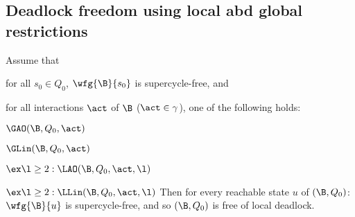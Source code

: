 







\subsection{Deadlock freedom using local abd global restrictions}


\label{theorem:local.deadlock-free}
Assume that
\bn
\item \label{theorem:local.deadlock-free.initial}
      for all $s_0 \in Q_0$, $\wfg{\B}{s_0}$ is supercycle-free, and
\item \label{theorem:local.deadlock-free.scfPres}
      for all interactions $\act$ of $\B$ (\ie $\act \in \gamma$), one of
      the following holds:
      \bn
      \item $\GAO(\B,Q_0,\act)$
      \item $\GLin(\B,Q_0,\act)$
      \item $\ex \l \ge 2: \LAO(\B,Q_0,\act,\l)$ 
      \item $\ex \l \ge 2: \LLin(\B,Q_0,\act,\l)$ 
      \en
\en
Then for every reachable state $u$ of $(\B, Q_0)$:  $\wfg{\B}{u}$ is supercycle-free, and so 
$(\B, Q_0)$ is free of local deadlock.
\et
{}

